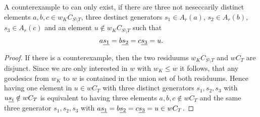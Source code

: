 \begin{lemm}
\label{lemm:counterexample-simplification2}
A counterexample to  can only exist, if there are three not
neseccarily distinct elements $a,b,c \in w_K C_{S \setminus T}$, three
destinct generators $s_1 \in A_r(a)$, $s_2 \in A_r(b)$, $s_3 \in A_r(c)$ and an
element $u \notin w_K C_{S \setminus T}$ such that
$$ a \underline{s_1} = b \underline{s_2} = c \underline{s_3} = u. $$

\begin{proof}
If there is a counterexample, then the two residuums $w_K C_{S \setminus T}$ and
$w C_T$ are disjunct. Since we are only interested in $w$ with $w_K \leq w$
it follows, that any geodesics from $w_K$ to $w$ is contained in the union set
of both residuums. Hence having one element in $u \in w C_T$ with three distinct
generators $s_1,s_2,s_3$ with $u \underline{s_i} \notin w C_T$ is equivalent to having
three elements $a,b,c \notin w C_T$ and the same three generator $s_1,s_2,s_3$
with $a \underline{s_1} = b \underline{s_2} = c \underline{s_3} = u \in w C_T$.
\end{proof}
\end{lemm}